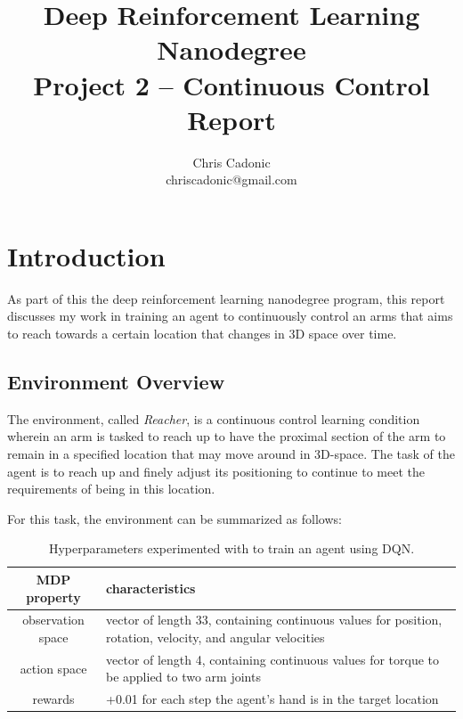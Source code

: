 \documentclass[11pt]{article}
\begin{document}
\title{Deep Reinforcement Learning Nanodegree\\
	   Project 2 -- Continuous Control Report}
\author{\vspace{-1mm}Chris Cadonic\\
chriscadonic@gmail.com}
\maketitle
\vspace{-1.5em}

\section{Introduction}

As part of this the deep reinforcement learning nanodegree program, this report discusses my work in training an agent to continuously control an arms that aims to reach towards a certain location that changes in 3D space over time.

\subsection{Environment Overview}

The environment, called \textit{Reacher}, is a continuous control learning condition wherein an arm is tasked to reach up to have the proximal section of the arm to remain in a specified location that may move around in 3D-space. The task of the agent is to reach up and finely adjust its positioning to continue to meet the requirements of being in this location.

For this task, the environment can be summarized as follows:

\begin{table}[!ht]
	\centering
	\begin{tabular}{ c | p{10cm} }
		\textbf{MDP property} & \textbf{characteristics} \\
		\hline
		observation space & vector of length 33, containing continuous values for position, rotation, velocity, and angular velocities \\
		\hline
		action space & vector of length 4, containing continuous values for torque to be applied to two arm joints \\
		\hline
		rewards & +0.01 for each step the agent's hand is in the target location \\
		\hline
	\end{tabular}
	\caption{Hyperparameters experimented with to train an agent using DQN.}
	\label{tbl:mdp}
\end{table}
\end{document}
